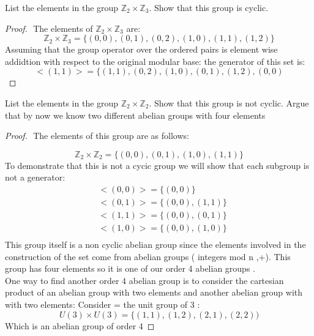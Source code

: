\documentclass[11pt]{article}
\theoremstyle{definition}  %
\newcommand{\Z}{\mathbb{Z}}
\newcommand{\block}[2]{\begin{tcolorbox}[title={#1}]{#2}\end{tcolorbox}}
\begin{document}
\block{Question 4}{
 List the elements in the group $\Z_2 \times \Z_3$. Show that this group is cyclic.
}
\begin{proof}
  $ $\newline
  The elements of $\Z_2 \times \Z_3$ are:
  \[
    \Z_2 \times \Z_3=\{(0,0),(0,1),(0,2),(1,0),(1,1),(1,2)\}
  \]
  Assuming that the group operator over the ordered pairs is element wise addidtion with respect to the original modular base:
  the generator of this set is:
  \[
    <(1,1)>=\{(1,1),(0,2),(1,0),(0,1),(1,2),(0,0)
  \]
\end{proof}
\block{Question 5}{
List the elements in the group $\Z_2 \times \Z_2$. Show that this group is not cyclic. Argue that by now we know two different abelian groups with four elements
}
\begin{proof}
  $ $\newline
  The elements of this group are as follows:

  \[
    \Z_2 \times \Z_2=\{(0,0),(0,1),(1,0),(1,1)\}
  \]
  To demonstrate that this is not a cycic group we will show that each subgroup is not a generator:
  \begin{align*}
    &<(0,0)>=\{(0,0)\}\\
    &<(0,1)>=\{(0,0),(1,1)\}\\
    &<(1,1)>=\{(0,0),(0,1)\}\\
    &<(1,0)>=\{(0,0),(1,0)\}\\
  \end{align*}
  This group itself is a non cyclic abelian group since the elements involved in the construction of the set come from abelian groups ( integers mod n ,+). This group has four elements so it is one of our order 4 abelian groups . \\

  One way to find another order 4 abelian group is to consider the cartesian product of  an abelian group with two elements and another abelian  group with with two elements:
  Consider = the unit group of 3 :
  \[
    U(3) \times U(3) =\{(1,1),(1,2),(2,1),(2,2))
  \]
  Which is an abelian group of order 4
\end{proof}
\end{document}
